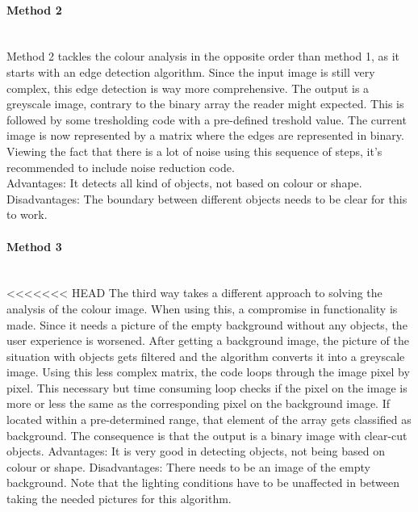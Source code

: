 \documentclass[11pt]{article}
\begin{document}
\paragraph{Method 2}\mbox{}\\
Method 2 tackles the colour analysis in the opposite order than method 1, as it starts with an edge detection algorithm. Since the input image is still very complex, this edge detection is way more comprehensive. The output is a greyscale image, contrary to the binary array the reader might expected. This is followed by some tresholding code with a pre-defined treshold value. The current image is now represented by a matrix where the edges are represented in binary. Viewing the fact that there is a lot of noise using this sequence of steps, it's recommended to include noise reduction code. 
\\Advantages: It detects all kind of objects, not based on colour or shape.
\\Disadvantages: The boundary between different objects needs to be clear for this to work.
\paragraph{Method 3}\mbox{}\\
<<<<<<< HEAD
The third way takes a different approach to solving the analysis of the colour image. When using this, a compromise in functionality is made. Since it needs a picture of the empty background without any objects, the user experience is worsened. After getting a background image, the picture of the situation with objects gets filtered and the algorithm converts it into a greyscale image. Using this less complex matrix, the code loops through the image pixel by pixel. This necessary but time consuming loop checks if the pixel on the image is more or less the same as the corresponding pixel on the background image. If located within a pre-determined range, that element of the array gets classified as background. The consequence is that the output is a binary image with clear-cut objects.
Advantages: It is very good in detecting objects, not being based on colour or shape.
Disadvantages: There needs to be an image of the empty background. Note that the lighting conditions have to be unaffected in between taking the needed pictures for this algorithm.
\end{document}
